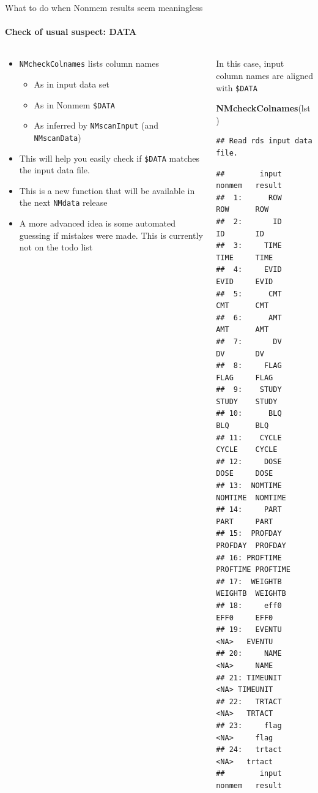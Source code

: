 \documentclass[
  8pt,
  ignorenonframetext,
  aspectratio=169]{beamer}
\newenvironment{Shaded}{\begin{snugshade}}{\end{snugshade}}
\newcommand{\KeywordTok}[1]{\textcolor[rgb]{0.13,0.29,0.53}{\textbf{#1}}}
\newcommand{\NormalTok}[1]{#1}
\providecommand{\tightlist}{%
  \setlength{\itemsep}{0pt}\setlength{\parskip}{0pt}}
\begin{document}
\begin{frame}[fragile]{What to do when Nonmem results seem meaningless}
\protect\hypertarget{what-to-do-when-nonmem-results-seem-meaningless}{}
\framesubtitle{Check of usual suspect: DATA}

\begin{columns}[T]
\begin{column}{0.48\textwidth}
\begin{itemize}
\tightlist
\item
  \texttt{NMcheckColnames} lists column names

  \begin{itemize}
  \tightlist
  \item
    As in input data set
  \item
    As in Nonmem \texttt{\$DATA}
  \item
    As inferred by \texttt{NMscanInput} (and \texttt{NMscanData})
  \end{itemize}
\item
  This will help you easily check if \texttt{\$DATA} matches the input
  data file.
\item
  This is a new function that will be available in the next
  \texttt{NMdata} release
\item
  A more advanced idea is some automated guessing if mistakes were made.
  This is currently not on the todo list
\end{itemize}
\end{column}

\begin{column}{0.48\textwidth}
In this case, input column names are aligned with \texttt{\$DATA}
\footnotesize

\begin{Shaded}
\begin{Highlighting}[]
\KeywordTok{NMcheckColnames}\NormalTok{(lst)}
\end{Highlighting}
\end{Shaded}

\begin{verbatim}
## Read rds input data file.
\end{verbatim}

\begin{verbatim}
##        input   nonmem   result
##  1:      ROW      ROW      ROW
##  2:       ID       ID       ID
##  3:     TIME     TIME     TIME
##  4:     EVID     EVID     EVID
##  5:      CMT      CMT      CMT
##  6:      AMT      AMT      AMT
##  7:       DV       DV       DV
##  8:     FLAG     FLAG     FLAG
##  9:    STUDY    STUDY    STUDY
## 10:      BLQ      BLQ      BLQ
## 11:    CYCLE    CYCLE    CYCLE
## 12:     DOSE     DOSE     DOSE
## 13:  NOMTIME  NOMTIME  NOMTIME
## 14:     PART     PART     PART
## 15:  PROFDAY  PROFDAY  PROFDAY
## 16: PROFTIME PROFTIME PROFTIME
## 17:  WEIGHTB  WEIGHTB  WEIGHTB
## 18:     eff0     EFF0     EFF0
## 19:   EVENTU     <NA>   EVENTU
## 20:     NAME     <NA>     NAME
## 21: TIMEUNIT     <NA> TIMEUNIT
## 22:   TRTACT     <NA>   TRTACT
## 23:     flag     <NA>     flag
## 24:   trtact     <NA>   trtact
##        input   nonmem   result
\end{verbatim}


\end{column}
\end{columns}
\end{frame}
\end{document}
